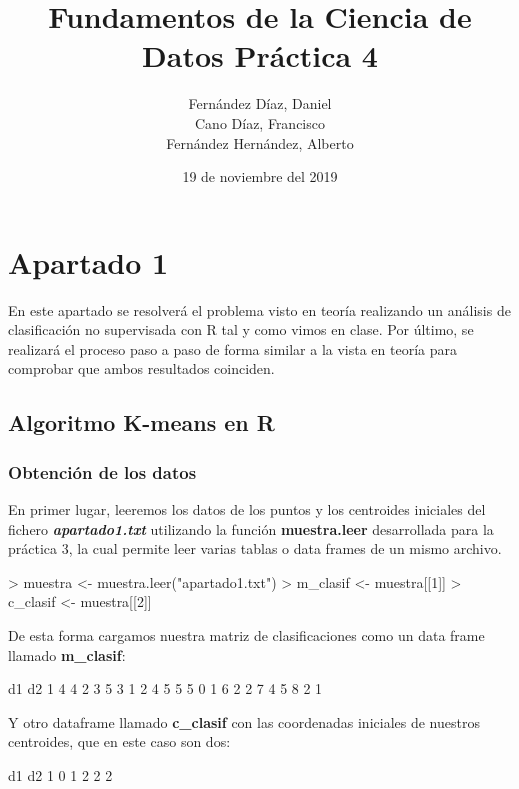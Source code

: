 \documentclass [a4paper] {article}
\title{\textbf{Fundamentos de la Ciencia de Datos Práctica 4}}
\author{
	Fernández Díaz, Daniel\\
	Cano Díaz, Francisco\\
	Fernández Hernández, Alberto\\
}
\date{19 de noviembre del 2019}
\begin{document}

\maketitle
\newpage
\tableofcontents
\newpage
\section{Apartado 1}
En este apartado se resolverá el problema visto en teoría realizando un análisis de clasificación no supervisada con R tal y como vimos en clase. Por último, se realizará el proceso paso a paso de forma similar a la vista en teoría para comprobar que ambos resultados coinciden.
\subsection{Algoritmo K-means en R}
\subsubsection{Obtención de los datos}
En primer lugar, leeremos los datos de los puntos y los centroides iniciales del fichero \textbf{\textit{apartado1.txt}} utilizando la función \textbf{muestra.leer} desarrollada para la práctica 3, la cual permite leer varias tablas o data frames de un mismo archivo.
\begin{footnotesize}

\begin{Schunk}
\begin{Sinput}
> muestra <- muestra.leer("apartado1.txt")
> m_clasif <- muestra[[1]]
> c_clasif <- muestra[[2]]
\end{Sinput}
\end{Schunk}
\end{footnotesize}
De esta forma cargamos nuestra matriz de clasificaciones como un data frame llamado \textbf{m\_clasif}:
\begin{Schunk}
\begin{Soutput}
  d1 d2
1  4  4
2  3  5
3  1  2
4  5  5
5  0  1
6  2  2
7  4  5
8  2  1
\end{Soutput}
\end{Schunk}

Y otro dataframe llamado \textbf{c\_clasif} con las coordenadas iniciales de nuestros centroides, que en este caso son dos:
\begin{Schunk}
\begin{Soutput}
  d1 d2
1  0  1
2  2  2
\end{Soutput}
\end{Schunk}
\end{document}
